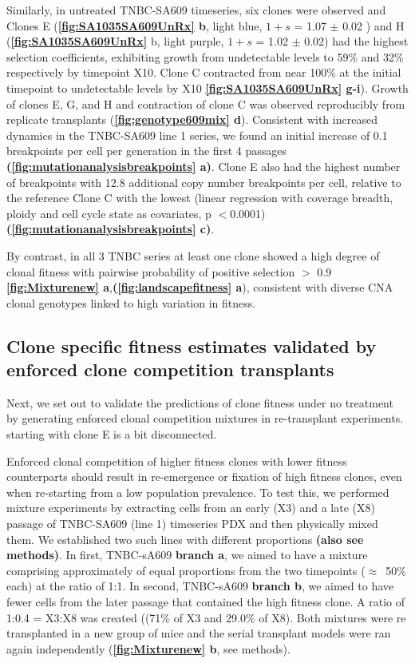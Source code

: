  
 Similarly, in untreated TNBC-SA609 timeseries, six clones were observed and Clones E (\textbf{\autoref{fig:SA1035SA609UnRx} b}, light blue, $1+s$ = 1.07 $\pm$ 0.02 ) and H (\textbf{\autoref{fig:SA1035SA609UnRx}} b, light purple, $1+s$ = 1.02 $\pm$ 0.02) had the highest selection coefficients, exhibiting growth from undetectable levels to 59\% and 32\% respectively by timepoint X10.
 Clone C contracted from near 100\% at the initial timepoint to undetectable levels by X10 \textbf{\autoref{fig:SA1035SA609UnRx} g-i}). Growth of clones E, G, and H and contraction of clone C was observed reproducibly from replicate transplants (\textbf{\autoref{fig:genotype609mix} d}).
 Consistent with increased dynamics in the TNBC-SA609 line 1 series, we found an initial increase of 0.1 breakpoints per cell per generation in the first 4 passages \textbf{(\autoref{fig:mutationanalysisbreakpoints} a)}.
 Clone E also had the highest number of breakpoints with 12.8 additional copy number breakpoints per cell, relative to the reference Clone C with the lowest (linear regression with coverage breadth, ploidy and cell cycle state as covariates, p $<$0.0001) \textbf{(\autoref{fig:mutationanalysisbreakpoints} c)}.

By contrast, in all 3 TNBC series at least one clone showed a high degree of clonal fitness with pairwise probability of positive selection $>$ 0.9  \textbf{\autoref{fig:Mixturenew} a},\textbf{(\autoref{fig:landscapefitness} a}), consistent with diverse CNA clonal genotypes linked to high variation in fitness.

\subsection{Clone specific fitness estimates validated by enforced clone competition transplants} 
Next, we set out to validate the predictions of clone fitness under no treatment by generating enforced clonal competition mixtures in re-transplant experiments. starting with clone E is a bit disconnected. 

Enforced clonal competition of higher fitness clones with lower fitness counterparts should result in re-emergence or fixation of high fitness clones, even when re-starting from a low population prevalence. To test this, we performed mixture experiments by extracting cells from an early (X3) and a late (X8) passage of TNBC-SA609 (line 1) timeseries PDX and then physically mixed them. We established two such lines with different proportions \textbf{(also see methods)}.
In first, TNBC-sA609 \textbf{branch a}, we aimed to have a mixture comprising approximately of equal proportions from the two timepoints ($\approx$~50\% each) at the ratio of 1:1. In second, TNBC-sA609 \textbf{branch b}, we aimed to have fewer cells from the later passage that contained the high fitness clone. A ratio of 1:0.4 = X3:X8 was created ((71\% of X3 and 29.0\% of X8). 
Both mixtures were re transplanted in a new group of mice and the serial transplant models were ran again independently (\textbf{\autoref{fig:Mixturenew} b}, see methods).

